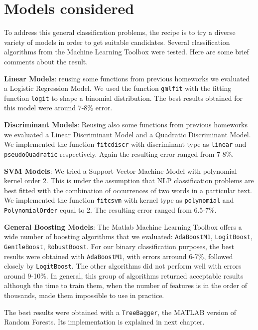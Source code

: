 \chapter{Models considered}
\label{ch:ch2models}

To address this general classification problems, the recipe is to try a diverse variety of models in order to get suitable candidates. Several classification algorithms from the Machine Learning Toolbox were tested. Here are some brief comments about the result.

\textbf{Linear Models}: reusing some functions from previous homeworks we evaluated a Logistic Regression Model. We used the function \verb|gmlfit| with the fitting function \verb|logit| to shape a binomial distribution.
The best results obtained for this model were around 7-8\% error.

\textbf{Discriminant Models}: Reusing also some functions from previous homeworks we evaluated a Linear Discriminant Model and a Quadratic Discriminant Model. We implemented the function \verb|fitcdiscr| with discriminant type as \verb|linear| and \verb|pseudoQuadratic| respectively. Again the resulting error ranged from 7-8\%.

\textbf{SVM Models}: We tried a Support Vector Machine Model with polynomial kernel order 2. This is under the assumption that NLP classification problems are best fitted with the combination of occurrences of two words in a particular text. We implemented the function \verb|fitcsvm| with kernel type as \verb|polynomial| and \verb|PolynomialOrder| equal to 2. The resulting error ranged from 6.5-7\%.

\textbf{General Boosting Models}: The Matlab Machine Learning Toolbox offers a wide number of boosting algorithms that we evaluated:
\verb|AdaBoostM1|, \verb|LogitBoost|, \verb|GentleBoost|, \verb|RobustBoost|. For our binary classification purposes, the best results were obtained with \verb|AdaBoostM1|, with errors arround 6-7\%, followed closely by \verb|LogitBoost|. The other algorithms did not perform well with errors around 9-10\%. In general, this group of algorithms returned acceptable results although the time to train them, when the number of features is in the order of thousands, made them impossible to use in practice.  

The best results were obtained with a \verb|TreeBagger|, the MATLAB version of Random Forests. Its implementation is explained in next chapter.
